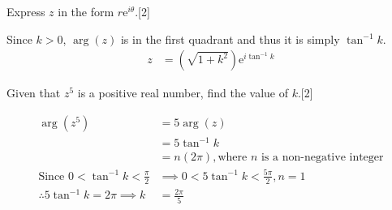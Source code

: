 \documentclass[12pt, a4 paper]{article}
\begin{document}
\begin{outline}[enumerate]
	\2 Express $z$ in the form $r\mathrm{e}^{i\theta}$.\hfill[2]
	\begin{answer}
		Since $k>0$, $\arg{(z)}$ is in the first quadrant and thus it is simply $\tan^{-1}k$.
		\begin{align*}
			z & = (\sqrt{1+k^2})\mathrm{e}^{i\tan^{-1}k} 
		\end{align*}
	\end{answer}
	\2 Given that $z^5$ is a positive real number, find the value of $k$.\hfill[2]
	\begin{answer}
		\begin{align*}
			\arg{(z^5)}                               & = 5\arg{(z)}                                                     \\
			                                          & = 5\tan^{-1}k                                                    \\
			                                          & = n(2\pi), \textrm{where } n \textrm{ is a non-negative integer} \\
			\textrm{Since }0<\tan^{-1}k<\frac{\pi}{2} & \implies0<5\tan^{-1}k<\frac{5\pi}{2}, n=1                        \\
			\therefore 5\tan^{-1}k=2\pi \implies k    & =\frac{2\pi}{5}                                                  
		\end{align*}
	\end{answer}
		        

\end{outline}
\end{document}
